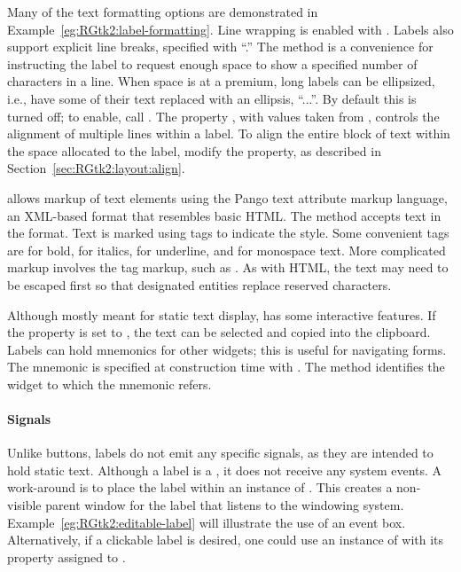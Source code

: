 Many of the text formatting options are demonstrated in
Example~\ref{eg:RGtk2:label-formatting}. Line wrapping is enabled with
. Labels also support explicit line
breaks, specified with ``\code{\backslashn}.'' The
 method is a convenience for instructing the
label to request enough space to show a specified number of
characters in a line.  When space is at a premium, long labels can be
ellipsized, i.e., have some of their text replaced with an
ellipsis, ``...''.  By default this is turned off; to enable, call
.  The property , with
values taken from , controls the alignment of
multiple lines within a label. To align the entire block of text
within the space allocated to the label, modify the 
property, as described in Section~\ref{sec:RGtk2:layout:align}.

\GTK\/ allows markup of text elements using the Pango text attribute
markup language, an XML-based format that resembles basic HTML. The
method  accepts text in the format. Text
is marked using tags to indicate the style. Some convenient tags are
 for bold,  for italics,  for
underline, and  for monospace text. More complicated markup
involves the  tag markup, such as . As with HTML, the text may need to be escaped
first so that designated entities replace reserved characters.

Although mostly meant for static text display,  has
some interactive features. If the  property is set to
, the text can be selected and copied into the clipboard.
Labels can hold mnemonics for other widgets; this is useful for
navigating forms. The mnemonic is specified at construction time with
. The
 method identifies the widget to
which the mnemonic refers.


\paragraph{Signals}
Unlike buttons, labels do not emit any specific signals, as they are
intended to hold static text. Although a label is a ,
it does not receive any system events. A work-around is to place the
label within an instance of . This creates a
non-visible parent window for the label that listens to the windowing
system. Example~\ref{eg:RGtk2:editable-label} will illustrate the use
of an event box.  Alternatively, if a clickable label is desired, one
could use an instance of  with its 
property assigned to . %


